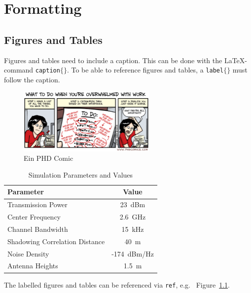 \chapter{Formatting}

\section{Figures and Tables}
Figures and tables need to include a caption. This can be done with the LaTeX-command \texttt{\bslash caption$\lbrace\rbrace$}. To be able to reference figures and tables, a \texttt{\bslash label$\lbrace\rbrace$} must follow the caption.

\begin{figure}[h!]
  \begin{center}
    \includegraphics[width=0.6\textwidth]{phd112013s.eps}
    \caption{Ein PHD Comic}
    \label{fig:ToUseWithReference}
  \end{center}
\end{figure}

\begin{table}[b]
\begin{center}
\begin{tabular}{|l |c|}
\hline 
\textbf{Parameter} & \textbf{Value} \\
\hline  
\hline 
Transmission Power & 23~dBm\\
\hline 
Center Frequency & 2.6~GHz\\
\hline 
Channel Bandwidth & 15~kHz\\
\hline 
Shadowing Correlation Distance & 40~m\\
\hline 
Noise Density & -174~dBm/Hz\\
\hline 
Antenna Heights & 1.5~m\\
\hline 
\end{tabular}
\caption{Simulation Parameters and Values}\label{tab:param_table}
\end{center}
\end{table}

The labelled figures and tables can be referenced via \texttt{\bslash ref}, e.g. ~Figure~\ref{fig:ToUseWithReference}.
\newpage
